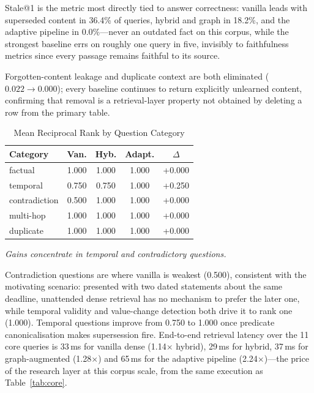 \documentclass[conference]{IEEEtran}
\begin{document}
Stale@1 is the metric most directly tied to answer correctness: vanilla leads with superseded content in 36.4\% of queries, hybrid and graph in 18.2\%, and the adaptive pipeline in 0.0\%---never an outdated fact on this corpus, while the strongest baseline errs on roughly one query in five, invisibly to faithfulness metrics since every passage remains faithful to its source.

Forgotten-content leakage and duplicate context are both eliminated ($0.022 \to 0.000$); every baseline continues to return explicitly unlearned content, confirming that removal is a retrieval-layer property not obtained by deleting a row from the primary table.

\begin{table}[htbp]
\caption{Mean Reciprocal Rank by Question Category}
\label{tab:category}
\centering
\scriptsize
\begin{tabular}{|l|c|c|c|c|}
\hline
\textbf{Category} & \textbf{Van.} & \textbf{Hyb.} & \textbf{Adapt.} & $\Delta$ \\
\hline
factual & 1.000 & 1.000 & 1.000 & +0.000 \\
\hline
temporal & 0.750 & 0.750 & 1.000 & +0.250 \\
\hline
contradiction & 0.500 & 1.000 & 1.000 & +0.000 \\
\hline
multi-hop & 1.000 & 1.000 & 1.000 & +0.000 \\
\hline
duplicate & 1.000 & 1.000 & 1.000 & +0.000 \\
\hline
\end{tabular}
\vspace{0.5mm}

{\scriptsize\itshape Gains concentrate in temporal and contradictory questions.}
\end{table}

Contradiction questions are where vanilla is weakest (0.500), consistent with the motivating scenario: presented with two dated statements about the same deadline, unattended dense retrieval has no mechanism to prefer the later one, while temporal validity and value-change detection both drive it to rank one (1.000). Temporal questions improve from 0.750 to 1.000 once predicate canonicalisation makes supersession fire. End-to-end retrieval latency over the 11 core queries is 33\,ms for vanilla dense (1.14$\times$ hybrid), 29\,ms for hybrid, 37\,ms for graph-augmented (1.28$\times$) and 65\,ms for the adaptive pipeline (2.24$\times$)---the price of the research layer at this corpus scale, from the same execution as Table~\ref{tab:core}.
\end{document}
